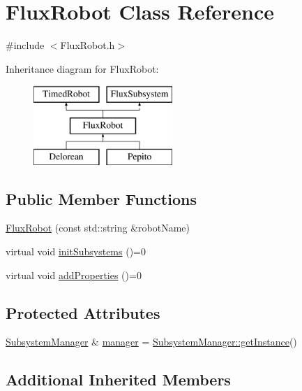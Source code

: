 \hypertarget{classFluxRobot}{}\section{Flux\+Robot Class Reference}
\label{classFluxRobot}


{\ttfamily \#include $<$Flux\+Robot.\+h$>$}

Inheritance diagram for Flux\+Robot\+:\begin{figure}[H]
\begin{center}
\leavevmode
\includegraphics[height=3.000000cm]{classFluxRobot}
\end{center}
\end{figure}
\subsection*{Public Member Functions}
\begin{DoxyCompactItemize}
\item 
\hyperlink{classFluxRobot_aaf20a889c03907de208317746f733d7a}{Flux\+Robot} (const std\+::string \&robot\+Name)
\item 
virtual void \hyperlink{classFluxRobot_aa5fcf98b4dfd539b1b49772381578dc8}{init\+Subsystems} ()=0
\item 
virtual void \hyperlink{classFluxRobot_a6f7940d8f82e80a6e405bad20ec9a5a5}{add\+Properties} ()=0
\end{DoxyCompactItemize}
\subsection*{Protected Attributes}
\begin{DoxyCompactItemize}
\item 
\hyperlink{classSubsystemManager}{Subsystem\+Manager} \& \hyperlink{classFluxRobot_a55d2406f800dddb8f7d4754ef5fb2ede}{manager} = \hyperlink{classSubsystemManager_a3acce674e15d2534ed8a0877b78ac64d}{Subsystem\+Manager\+::get\+Instance}()
\end{DoxyCompactItemize}
\subsection*{Additional Inherited Members}


